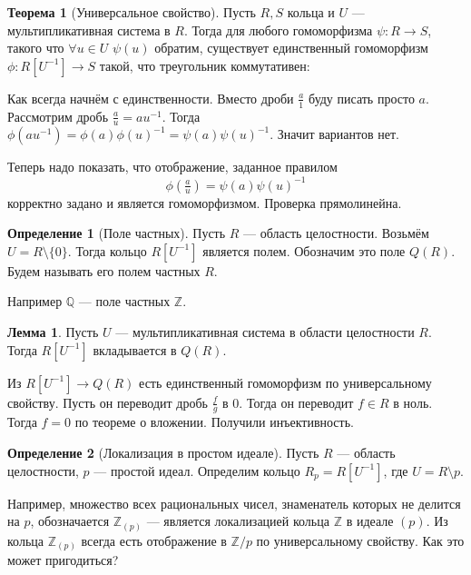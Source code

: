 \documentclass[10pt,a4paper,oneside]{book}
\theoremstyle{definition}
\newtheorem*{defn}{Определение}
\newtheorem{thm}{Теорема}
\newtheorem{lem}{Лемма}
\newcommand{\mb}[1]{\mathbb{#1}}
\def\thrm{\begin{thm}}
\def\ethrm{\end{thm}}
\def\dfn{\begin{defn}}
\def\edfn{\end{defn}}
\def\lm{\begin{lem}}
\def\elm{\end{lem}}
\begin{document}

\thrm[Универсальное свойство] Пусть $R,S$ кольца и $U$ --- мультипликативная система в $R$. Тогда для любого гомоморфизма $\psi \colon R\to S$, такого что $\forall u\in U \,\,\psi(u)$ обратим, существует единственный гомоморфизм $\phi\colon R[U^{-1} ] \to S$ такой, что треугольник коммутативен:
\begin{center}
\end{center}
\ethrm
\proof
Как всегда начнём с единственности. Вместо дроби $\tfrac{a}{1}$ буду писать просто $a$. Рассмотрим дробь $\tfrac{a}{u}=au^{-1}$. Тогда $\phi(au^{-1})=\phi(a)\phi(u)^{-1}=\psi(a)\psi(u)^{-1}$. Значит вариантов нет.

Теперь надо показать, что отображение, заданное правилом
$$\phi(\tfrac{a}{u})=\psi(a)\psi(u)^{-1}$$
корректно задано и является гомоморфизмом. Проверка прямолинейна.
\endproof

\dfn[Поле частных] Пусть $R$ --- область целостности. Возьмём $U=R\setminus \{0\}$. Тогда кольцо $R[U^{-1}]$ является полем. Обозначим это поле $Q(R)$. Будем называть его полем частных $R$.
\edfn

Например $\mb Q$ --- поле частных $\mb Z$.

\lm Пусть $U$ --- мультипликативная система в области целостности $R$. Тогда $R[U^{-1}]$ вкладывается в $Q(R)$.
\elm
\proof
Из $R[U^{-1}]\to Q(R)$ есть единственный гомоморфизм по универсальному свойству. Пусть он переводит дробь $\frac{f}{g}$ в $0$. Тогда он переводит $f\in R$ в ноль. Тогда  $f=0$ по теореме о вложении. Получили инъективность.
\endproof

\dfn[Локализация в простом идеале] Пусть $R$  --- область целостности, $p$ --- простой идеал. Определим кольцо $R_p= R[U^{-1}]$, где $U=R\setminus p$.
\edfn

Например, множество всех рациональных чисел, знаменатель которых не делится на $p$, обозначается $\mb Z_{(p)}$ --- является локализацией кольца $\mb Z$ в идеале $(p)$. Из кольца $\mb Z_{(p)}$ всегда есть отображение в $\mb Z/p$ по универсальному свойству. Как это может пригодиться?
\end{document}
